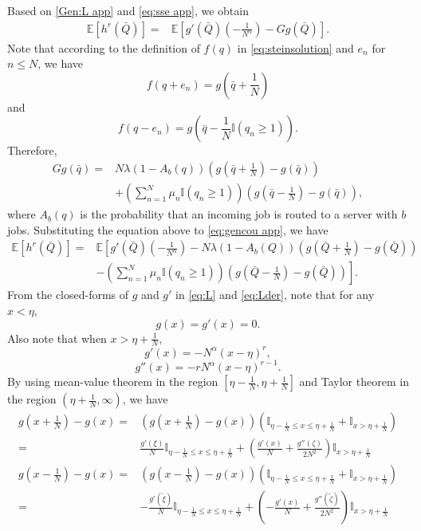 \documentclass[11pt,oneside,letter]{article}
\begin{document}
Based on \eqref{Gen:L app} and \eqref{eq:sse app}, we obtain
\begin{align}
\mathbb{E}\left[{h^r}\left(\bar Q\right)\right] =& \mathbb{E}\left[ g'\left(\bar Q\right)  \left(-\frac{1}{N^{\alpha}}\right) - Gg\left(\bar Q\right)\right].\label{eq:gencou app}
\end{align}
Note that according to the definition of $f(q)$ in \eqref{eq:steinsolution} and $e_n$ for $n\leq N$, we have $$f(q+e_n)=g\left(\bar q+\frac{1}{N}\right)$$ and
$$f(q-e_n)=g\left(\bar q-\frac{1}{N}\mathbb{I}(q_n\geq 1)\right).$$ Therefore,
\begin{align*}
    Gg\left(\bar q\right)=&
    N\lambda(1-A_b(q))\left(g\left(\bar q+\frac{1}{N}\right)-g\left(\bar q\right)\right)\\
    &+\left(\sum_{n=1}^{N} \mu_n \mathbb{I}(q_n\geq 1)\right) \left(g\left(\bar q-\frac{1}{N}\right)-g\left(\bar q\right)\right),
\end{align*} where $A_b(q)$ is the probability that an incoming job is routed to a server with $b$ jobs. 
Substituting the equation above to \eqref{eq:gencou app}, we have \begin{align}
\mathbb{E}\left[{h^r}\left(\bar Q\right)\right]
=&\mathbb{E}\left[g'\left(\bar Q\right) \left(-\frac{1}{N^{\alpha}}\right)-N\lambda(1-A_b(Q))\left(g\left(\bar Q+\frac{1}{N}\right)-g\left(\bar Q\right)\right)\right.\nonumber\\
    &\left.-\left(\sum_{n=1}^{N} \mu_n \mathbb{I}(q_n\geq 1)\right) \left(g\left(\bar Q-\frac{1}{N}\right)-g\left(\bar Q\right)\right)\right]. \label{gen-diff-expand}
\end{align}
From the closed-forms of $g$ and $g'$ in \eqref{eq:L} and \eqref{eq:Lder}, note that for any $x <  \eta,$
\begin{equation*}
g(x) = g'\left(x\right)=0.
\end{equation*} Also note that when $x>\eta+\frac{1}{N},$
$$g'(x)=- N^{\alpha} \left(x-\eta\right)^{r},$$
\begin{equation}g''(x)=- r N^{\alpha}\left(x-\eta\right)^{r-1} .\end{equation}
By using mean-value theorem in the region $[\eta-\frac{1}{N}, \eta+\frac{1}{N}]$ and Taylor theorem in the region $(\eta+\frac{1}{N}, \infty)$, we have
\begin{align}
g(x+\frac{1}{N})-g\left(x\right) =& \left(g(x+\frac{1}{N})-g\left(x\right)\right) \left(\mathbb I_{\eta-\frac{1}{N} \leq x \leq \eta+\frac{1}{N}} + \mathbb I_{ x > \eta+\frac{1}{N}} \right) \nonumber\\
=&  \frac{g'(\xi)}{N}\mathbb I_{\eta-\frac{1}{N} \leq x \leq \eta+\frac{1}{N}} + \left(\frac{g'(x)}{N} +  \frac{g''(\zeta)}{2N^2}\right) \mathbb I_{ x > \eta+\frac{1}{N}} \label{g+1/N}\\
g(x-\frac{1}{N})-g\left(x\right) =& \left(g(x-\frac{1}{N})-g\left(x\right)\right) \left(\mathbb I_{\eta-\frac{1}{N} \leq x \leq \eta+\frac{1}{N}} + \mathbb I_{ x > \eta+\frac{1}{N}} \right) \nonumber\\
=&  -\frac{g'(\tilde{\xi})}{N}\mathbb I_{\eta-\frac{1}{N} \leq x \leq \eta+\frac{1}{N}} + \left(-\frac{g'(x)}{N} +  \frac{g''(\tilde{\zeta})}{2N^2}\right) \mathbb I_{ x > \eta+\frac{1}{N}} \label{g-1/N}
\end{align}
\end{document}
